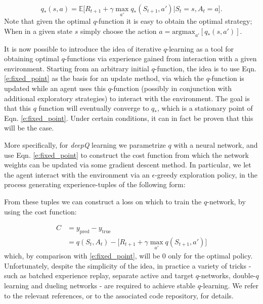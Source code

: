 \documentclass[twocolumn,preprintnumbers,amsmath,amssymb,notitlepage,nofootinbib,longbibliography,superscriptaddress,aps,pra,10pt]{revtex4-1}
\begin{document}
    \begin{equation}\label{e:fixed_point}
        q_*(s,a) = \mathbb{E}\big[R_{t+1} + \gamma\max_{a'}q_{*}(S_{t+1},a')\big|S_t = s, A_t = a \big].
    \end{equation}
    Note that given the optimal $q$-function it is easy to obtain the optimal strategy; When in a given state $s$ simply choose the action $a = \mathrm{argmax}_{a'}[q_*(s,a')]$.

    It is now possible to introduce the idea of iterative $q$-learning as a tool for obtaining optimal $q$-functions via experience gained from interaction with a given environment. 
    Starting from an arbitrary initial $q$-function, the idea is to use Eqn. \eqref{e:fixed_point} as the basis for an update method, via which the $q$-function is updated while an agent uses this $q$-function (possibly in conjunction with additional exploratory strategies) to interact with the environment. 
    The goal is that this $q$ function will eventually converge to $q_*$, which is a stationary point of Eqn. \eqref{e:fixed_point}. 
    Under certain conditions, it can in fact be proven that this will be the case.

    More specifically, for \textit{deepQ} learning we parametrize $q$ with a neural network, and use Eqn. \eqref{e:fixed_point} to construct the cost function from which the network weights can be updated via some gradient descent method. In particular, we let the agent interact with the environment via an $\epsilon$-greedy exploration policy, in the process generating experience-tuples of the following form:

    \begin{equation}
        [S_t,A_t,R_{t+1},S_{t+1}]
    \end{equation}
    From these tuples we can construct a loss on which to train the $q$-network, by using the cost function:

    \begin{align} 
    C &= y_{\mathrm{pred}} - y_{\mathrm{true}}\\
    &= q(S_t,A_t) - \big[R_{t+1} + \gamma\max_{a'}q(S_{t+1},a') \big]
    \end{align}
    which, by comparison with \eqref{e:fixed_point}, will be 0 only for the optimal policy. Unfortunately, despite the simplicity of the idea, in practice a variety of tricks - such as batched experience replay, separate active and target $q$-networks, double-$q$ learning and dueling networks - are required to achieve stable $q$-learning. We refer to the relevant references, or to the associated code repository, for details.
\end{document}
